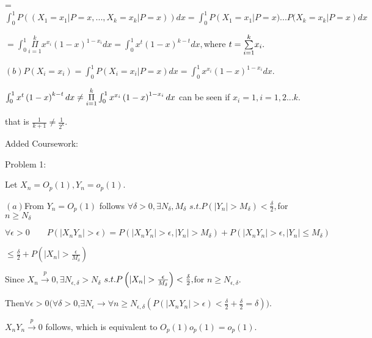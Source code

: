 \documentclass{article}
\begin{document}
=$\int_{0}^{1}P\left( \left( X_{1}=x_{1}|P=x,...,X_{k}=x_{k}|P=x\right)
\right) dx=\int_{0}^{1}P\left( X_{1}=x_{1}|P=x)...P(X_{k}=x_{k}|P=x\right)
dx $

$=\int_{0}^{1}\underset{i=1}{\overset{k}{\Pi }}x^{x_{i}}\left( 1-x\right)
^{1-x_{i}}dx=\int_{0}^{1}x^{t}\left( 1-x\right) ^{k-t}dx,$where $t=\underset{%
i=1}{\overset{k}{\sum }}x_{i}.$

$\left( b\right) P\left( X_{i}=x_{i}\right)
=\int_{0}^{1}P(X_{i}=x_{i}|P=x)dx=\int_{0}^{1}x^{x_{i}}\left( 1-x\right)
^{1-x_{i}}dx.$

$\int_{0}^{1}x^{t}\left( 1-x\right) ^{k-t}dx\neq \underset{i=1}{\overset{k}{%
\Pi }}\int_{0}^{1}x^{x_{i}}\left( 1-x\right) ^{1-x_{i}}dx$ can be seen if $%
x_{i}=1,i=1,2...k.$

that is $\frac{1}{k+1}\neq \frac{1}{2^{k}}.$

\bigskip

Added Coursework:

Problem 1:

\bigskip Let $X_{n}=O_{p}\left( 1\right) ,Y_{n}=o_{p}\left( 1\right) .$

$\left( a\right) $From $Y_{n}=O_{p}\left( 1\right) $ follows $\forall \delta
>0,\exists N_{\delta },M_{\delta }$ $s.t.P\left( \left\vert Y_{n}\right\vert
>M_{\delta }\right) <\frac{\delta }{2},$for $n\geq N_{\delta }$

$\forall \epsilon >0\qquad P\left( \left\vert X_{n}Y_{n}\right\vert
>\epsilon \right) =P\left( \left\vert X_{n}Y_{n}\right\vert >\epsilon
,\left\vert Y_{n}\right\vert >M_{\delta }\right) +P\left( \left\vert
X_{n}Y_{n}\right\vert >\epsilon ,\left\vert Y_{n}\right\vert \leq M_{\delta
}\right) $

$\leq \frac{\delta }{2}+P\left( \left\vert X_{n}\right\vert >\frac{\epsilon 
}{M_{\delta }}\right) $

\bigskip Since $X_{n}\overset{p}{\rightarrow }0,\exists N_{\epsilon ,\delta
}>N_{\delta }$ $s.t.P\left( \left\vert X_{n}\right\vert >\frac{\epsilon }{%
M_{\delta }}\right) <\frac{\delta }{2},$for $n\geq N_{\epsilon ,\delta }.$

Then$\forall \epsilon >0(\forall \delta >0$,$\exists N_{\epsilon
}\rightarrow \forall n\geq N_{\epsilon ,\delta }(P\left( \left\vert
X_{n}Y_{n}\right\vert >\epsilon \right) <\frac{\delta }{2}+\frac{\delta }{2}%
=\allowbreak \delta )).$

\bigskip $X_{n}Y_{n}\overset{p}{\rightarrow }0$ follows, which is equivalent
to $O_{p}\left( 1\right) o_{p}\left( 1\right) =o_{p}\left( 1\right) .$
\end{document}
